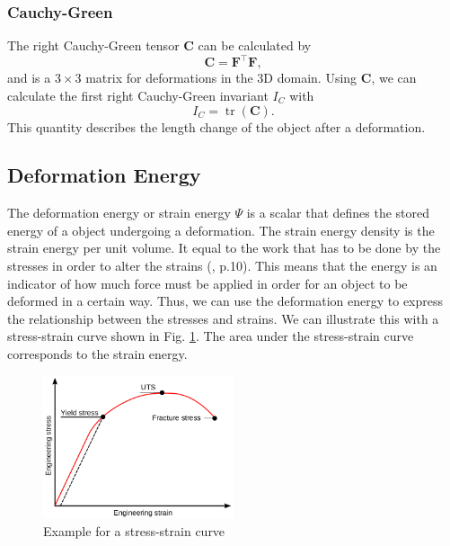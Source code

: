 \subsubsection{Cauchy-Green}
The right Cauchy-Green tensor \textbf{C} can be calculated by 
\begin{equation}\label{CG_DG}
	\mathbf{C} = \mathbf{F^\intercal F},
\end{equation}
and is a $3 \times 3$ matrix for deformations in the 3D domain. Using \textbf{C}, we can calculate the first right Cauchy-Green invariant $I_C$ with
\begin{equation} \label{tr_CG_DG}
	I_C = \operatorname{tr}(\mathbf{C}).
\end{equation}
This quantity describes the length change of the object after a deformation.

\subsection{Deformation Energy}
The deformation energy or strain energy $\Psi$ is a scalar that defines the stored energy of a object undergoing a deformation. The strain energy density is the strain energy per unit volume. It equal to the work that has to be done by the stresses in order to alter the strains (\cite{KORSUNSKY20175}, p.10). This means that the energy is an indicator of how much force must be applied in order for an object to be deformed in a certain way. Thus, we can use the deformation energy to express the relationship between the stresses and strains. We can illustrate this with a stress-strain curve shown in Fig. \ref{fig:stress_strain}. The area under the stress-strain curve corresponds to the strain energy. 
\begin{figure}[!htbp]
	\centering
	\includegraphics[width=0.5\textwidth]{resources/stress_strain_curve.png}
	\caption[Stress-strain curve]{Example for a stress-strain curve\footnotemark}
	\label{fig:stress_strain}
\end{figure}

